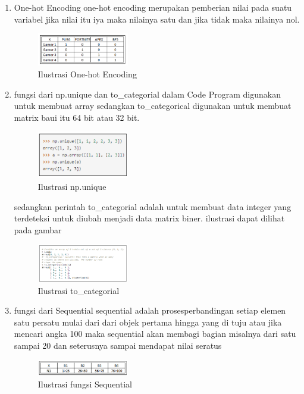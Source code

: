 \begin{enumerate}
        \item One-hot Encoding
        \subitem one-hot encoding merupakan pemberian nilai pada suatu variabel jika nilai itu iya maka nilainya satu dan jika tidak maka nilainya nol.

        \begin{figure}[H]
            \includegraphics[width=4cm]{figures/1174095/tugas6/teori6.png}
            \centering
              \caption{Ilustrasi One-hot Encoding}
        \end{figure}
        
        \item fungsi dari np.unique dan to\_categorial dalam Code Program
        \subitem digunakan untuk membuat array sedangkan  to\_categorical digunakan untuk membuat matrix baui itu 64 bit atau 32 bit.
        
        \begin{figure}[H]
            \includegraphics[width=4cm]{figures/1174095/tugas6/teori7.png}
            \centering
              \caption{Ilustrasi np.unique}
        \end{figure}
        
        \subitem sedangkan perintah to\_categorial adalah untuk membuat data integer yang terdeteksi untuk diubah menjadi data matrix biner. ilustrasi dapat dilihat pada gambar
        
        \begin{figure}[H]
            \includegraphics[width=4cm]{figures/1174095/tugas6/teori8.png}
            \centering
              \caption{Ilustrasi to\_categorial}
        \end{figure}
        
        \item fungsi dari Sequential
        \subitem sequential adalah prosesperbandingan setiap elemen satu persatu mulai dari dari objek pertama hingga yang di tuju atau jika mencari angka 100 maka sequential akan membagi bagian misalnya dari satu sampai 20 dan seterusnya sampai mendapat nilai seratus
        
        \begin{figure}[H]
            \includegraphics[width=4cm]{figures/1174095/tugas6/teori9.png}
            \centering
              \caption{Ilustrasi fungsi Sequential}
        \end{figure}
        \end{enumerate}

